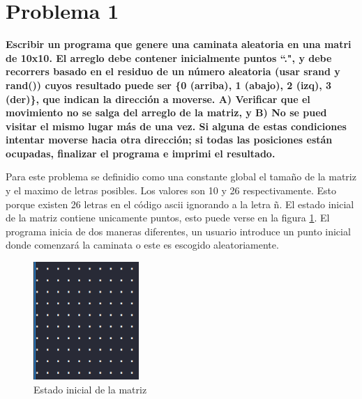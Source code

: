 \section*{Problema 1}

\textbf{Escribir un programa que genere una caminata aleatoria en una matri de 10x10. El arreglo debe contener inicialmente puntos ``.", y debe recorrers basado en el residuo de un número aleatoria (usar srand y rand()) cuyos resultado puede ser \{0 (arriba), 1 (abajo), 2 (izq), 3 (der)\}, que indican la dirección a moverse. A) Verificar que el movimiento no se salga del arreglo de la matriz, y B) No se pued visitar el mismo lugar más de una vez. Si alguna de estas condiciones intentar moverse hacia otra dirección; si todas las posiciones están ocupadas, finalizar el programa e imprimi el resultado.}

Para este problema se definidio como una constante global el tamaño de la matriz y el maximo de letras posibles. Los valores son 10 y 26 respectivamente. Esto porque existen 26 letras en el código ascii ignorando a la letra ñ. El estado inicial de la matriz contiene unicamente puntos, esto puede verse en la figura \ref{fig:initial_state_problem1}. El programa inicia de dos maneras diferentes, un usuario introduce un punto inicial donde comenzará la caminata o este es escogido aleatoriamente.

\begin{figure}[H]
    \centering
    \includegraphics[width=4cm]{Graphics/initial_problem1.png}
    \caption{Estado inicial de la matriz}
    \label{fig:initial_state_problem1}
\end{figure}

